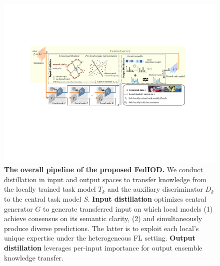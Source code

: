 \documentclass[letterpaper]{article} %
\begin{document}
\begin{figure}
\centering
\includegraphics[width=\linewidth]{fig/fig2_new.pdf}
\caption{\textbf{The overall pipeline of the proposed FedIOD.} We conduct distillation in input and output spaces to transfer knowledge from the locally trained task model $T_k$ and the auxiliary discriminator $D_k$ to the central task model $S$. \textbf{Input distillation} optimizes central generator $G$ to generate transferred input on which local models (1) achieve consensus on its semantic clarity, 
(2) and simultaneously produce diverse predictions. The latter is to exploit each local's unique expertise under the heterogeneous FL setting. 
\textbf{Output distillation} leverages per-input importance for output ensemble knowledge transfer. 
} 
\label{fig2}
\end{figure}
\end{document}
